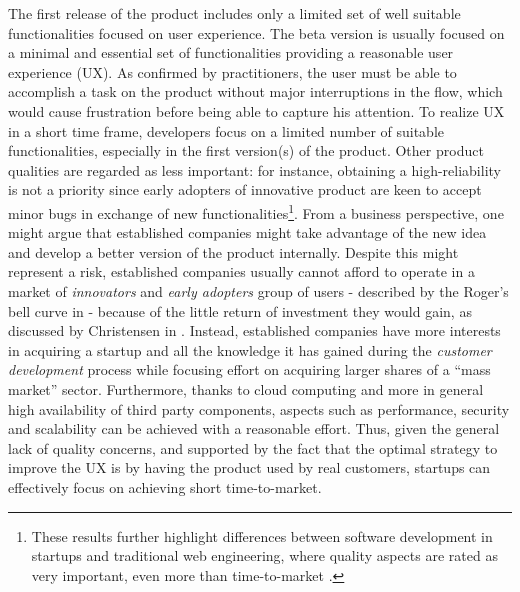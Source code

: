 \documentclass[10pt,journal,letterpaper,compsoc]{IEEEtran}
\begin{document}
\begin{compactitem}
\item The first release of the product includes only a limited set of well 
suitable functionalities focused on user experience. The beta version is usually 
focused on a minimal and essential set of functionalities providing a reasonable 
user experience (UX). As confirmed by practitioners, the user must be able to 
accomplish a task on the product without major interruptions in the flow, which 
would cause frustration before being able to capture his attention. To realize 
UX in a short time frame, developers focus on a limited number of suitable 
functionalities, especially in the first version(s) of the product. Other 
product qualities are regarded as less important: for instance, obtaining a 
high-reliability is not a priority since early adopters of innovative product 
are keen to accept minor bugs in exchange of new functionalities\footnote{These 
results further highlight differences between software development in startups 
and traditional web engineering, where quality aspects are rated as very 
important, even more than time-to-market \cite{Offutt2002}.}. From a business 
perspective, one might argue that established companies might take advantage of 
the new idea and develop a better version of the product internally. Despite 
this might represent a risk, established companies usually cannot afford to 
operate in a market of \textit{innovators} and \textit{early adopters} group of 
users - described by the Roger's bell curve in \cite{Rogers} - because of the 
little return of investment they would gain, as discussed by Christensen in 
\cite{Christensen2003}. Instead, established companies have more interests in 
acquiring a startup and all the knowledge it has gained during the 
\textit{customer development} process while focusing effort on acquiring larger 
shares of a ``mass market'' sector. Furthermore, thanks to cloud computing and 
more in general high availability of third party components, aspects such as 
performance, security and scalability can be achieved with a reasonable effort. 
Thus, given the general lack of quality concerns, and supported by the fact that 
the optimal strategy to improve the UX is by having the product used by real 
customers, startups can effectively focus on achieving short time-to-market.


\end{compactitem}
\end{document}
